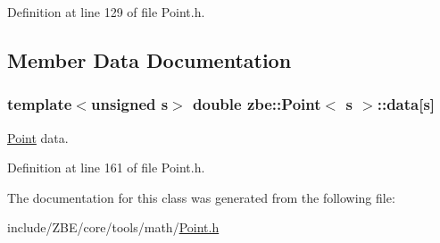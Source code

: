 Definition at line 129 of file Point.\+h.



\subsection{Member Data Documentation}
\hypertarget{classzbe_1_1_point_a44784a8fc0112f976473e8e2da0193e5}{}
\subsubsection[{data}]{\setlength{\rightskip}{0pt plus 5cm}template$<$unsigned s$>$ double {\bf zbe\+::\+Point}$<$ s $>$\+::data\mbox{[}s\mbox{]}\hspace{0.3cm}{\ttfamily [protected]}}\label{classzbe_1_1_point_a44784a8fc0112f976473e8e2da0193e5}


\hyperlink{classzbe_1_1_point}{Point} data. 



Definition at line 161 of file Point.\+h.



The documentation for this class was generated from the following file\+:\begin{DoxyCompactItemize}
\item 
include/\+Z\+B\+E/core/tools/math/\hyperlink{_point_8h}{Point.\+h}\end{DoxyCompactItemize}
